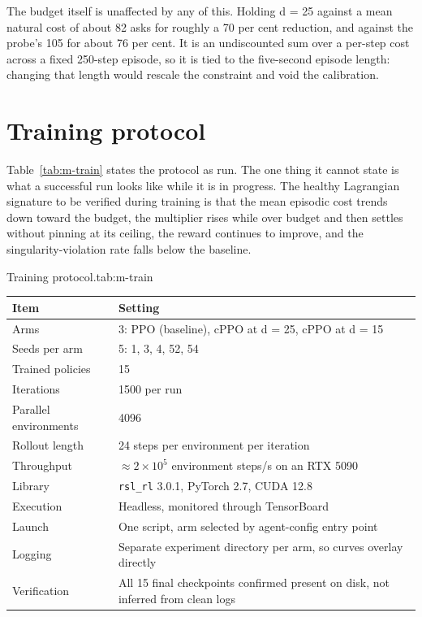 The budget itself is unaffected by any of this. Holding d = 25 against a mean natural cost of about
82 asks for roughly a 70 per cent reduction, and against the probe's 105 for about 76 per cent. It
is an undiscounted sum over a per-step cost across a fixed 250-step episode, so it is tied to the
five-second episode length: changing that length would rescale the constraint and void the
calibration.

\section{Training protocol}\label{sec:m-train}

Table~\ref{tab:m-train} states the protocol as run. The one thing it cannot state is what a
successful run looks like while it is in progress.
The healthy Lagrangian signature to be verified during training is that the mean episodic cost trends
down toward the budget, the multiplier rises while over budget and then settles without pinning at its
ceiling, the reward continues to improve, and the singularity-violation rate falls below the baseline.

\begin{kuettable}[H]{Training protocol.}{tab:m-train}
\begin{tabular*}{\textwidth}{@{\extracolsep{\fill}}p{}p{}}
\toprule
Item & Setting\\
\midrule
Arms & 3: PPO (baseline), cPPO at d = 25, cPPO at d = 15\\
Seeds per arm & 5: 1, 3, 4, 52, 54\\
Trained policies & 15\\
Iterations & 1500 per run\\
Parallel environments & 4096\\
Rollout length & 24 steps per environment per iteration\\
Throughput & \(\approx 2\times10^{5}\) environment steps/s on an RTX 5090\\
Library & \texttt{rsl\_rl} 3.0.1, PyTorch 2.7, CUDA 12.8\\
Execution & Headless, monitored through TensorBoard\\
Launch & One script, arm selected by agent-config entry point\\
Logging & Separate experiment directory per arm, so curves overlay directly\\
Verification & All 15 final checkpoints confirmed present on disk, not inferred from clean logs\\
\bottomrule
\end{tabular*}
\end{kuettable}

